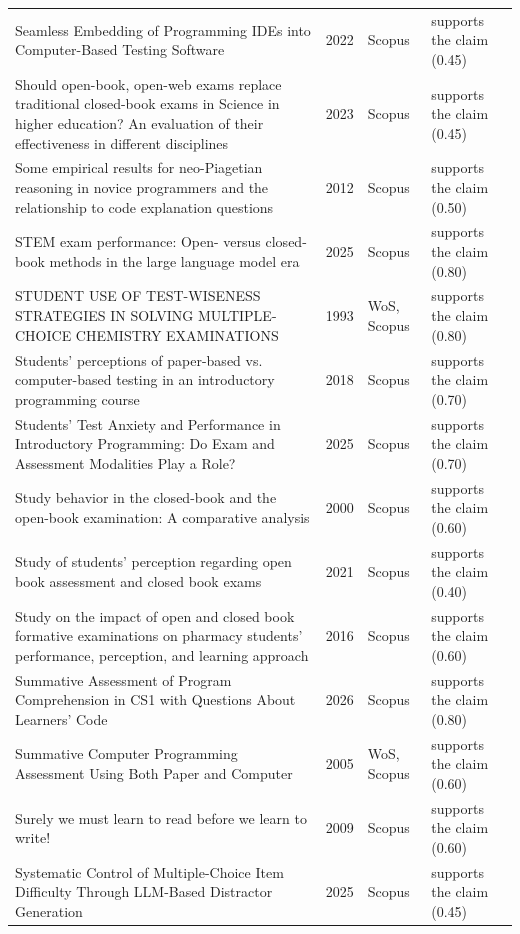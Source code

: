\begin{longtable}{@{}%
  >{\raggedright\arraybackslash}p{}c%
  >{\raggedright\arraybackslash}p{}%
  >{\raggedright\arraybackslash}p{}@{}}
Seamless Embedding of Programming IDEs into Computer-Based Testing Software & 2022 & Scopus & supports the claim (0.45) \\
Should open-book, open-web exams replace traditional closed-book exams in Science in higher education? An evaluation of their effectiveness in different disciplines & 2023 & Scopus & supports the claim (0.45) \\
Some empirical results for neo-Piagetian reasoning in novice programmers and the relationship to code explanation questions & 2012 & Scopus & supports the claim (0.50) \\
STEM exam performance: Open- versus closed-book methods in the large language model era & 2025 & Scopus & supports the claim (0.80) \\
STUDENT USE OF TEST-WISENESS STRATEGIES IN SOLVING MULTIPLE-CHOICE CHEMISTRY EXAMINATIONS & 1993 & WoS, Scopus & supports the claim (0.80) \\
Students' perceptions of paper-based vs. computer-based testing in an introductory programming course & 2018 & Scopus & supports the claim (0.70) \\
Students' Test Anxiety and Performance in Introductory Programming: Do Exam and Assessment Modalities Play a Role? & 2025 & Scopus & supports the claim (0.70) \\
Study behavior in the closed-book and the open-book examination: A comparative analysis & 2000 & Scopus & supports the claim (0.60) \\
Study of students' perception regarding open book assessment and closed book exams & 2021 & Scopus & supports the claim (0.40) \\
Study on the impact of open and closed book formative examinations on pharmacy students' performance, perception, and learning approach & 2016 & Scopus & supports the claim (0.60) \\
Summative Assessment of Program Comprehension in CS1 with Questions About Learners' Code & 2026 & Scopus & supports the claim (0.80) \\
Summative Computer Programming Assessment Using Both Paper and Computer & 2005 & WoS, Scopus & supports the claim (0.60) \\
Surely we must learn to read before we learn to write! & 2009 & Scopus & supports the claim (0.60) \\
Systematic Control of Multiple-Choice Item Difficulty Through LLM-Based Distractor Generation & 2025 & Scopus & supports the claim (0.45) \\

\end{longtable}
